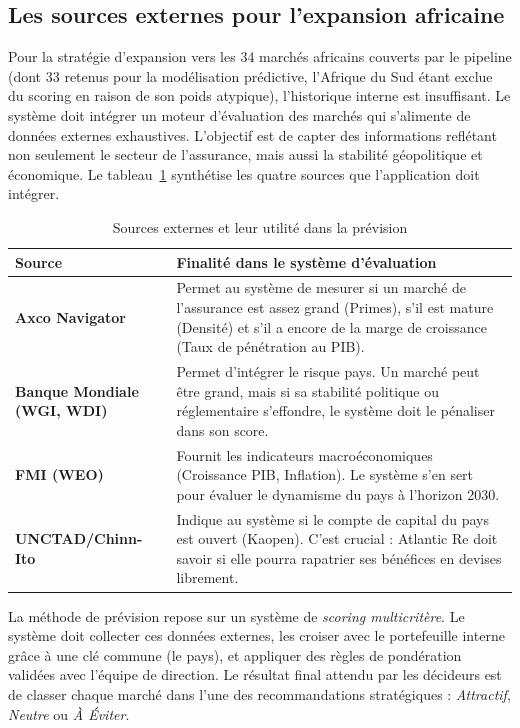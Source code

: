 \documentclass[12pt,a4paper]{report}
\begin{document}
\subsection{Les sources externes pour l'expansion africaine}

Pour la stratégie d'expansion vers les 34 marchés africains couverts par le pipeline (dont 33 retenus pour la modélisation prédictive, l'Afrique du Sud étant exclue du scoring en raison de son poids atypique), l'historique interne est insuffisant. Le système doit intégrer un moteur d'évaluation des marchés qui s'alimente de données externes exhaustives. L'objectif est de capter des informations reflétant non seulement le secteur de l'assurance, mais aussi la stabilité géopolitique et économique. Le tableau~\ref{tab:sources_externes} synthétise les quatre sources que l'application doit intégrer.

\begin{table}[H]
\centering
\caption{Sources externes et leur utilité dans la prévision}
\label{tab:sources_externes}
\small
\begin{tabularx}{\textwidth}{@{}p{3.5cm}X@{}}
\toprule
\textbf{Source} & \textbf{Finalité dans le système d'évaluation} \\
\midrule
\textbf{Axco Navigator} & Permet au système de mesurer si un marché de l'assurance est assez grand (Primes), s'il est mature (Densité) et s'il a encore de la marge de croissance (Taux de pénétration au PIB).\\
\textbf{Banque Mondiale \newline (WGI, WDI)} & Permet d'intégrer le risque pays. Un marché peut être grand, mais si sa stabilité politique ou réglementaire s'effondre, le système doit le pénaliser dans son score.\\
\textbf{FMI (WEO)} & Fournit les indicateurs macroéconomiques (Croissance PIB, Inflation). Le système s'en sert pour évaluer le dynamisme du pays à l'horizon 2030.\\
\textbf{UNCTAD/Chinn-Ito} & Indique au système si le compte de capital du pays est ouvert (Kaopen). C'est crucial : Atlantic Re doit savoir si elle pourra rapatrier ses bénéfices en devises librement.\\
\bottomrule
\end{tabularx}
\end{table}

La méthode de prévision repose sur un système de \textit{scoring multicritère}. Le système doit collecter ces données externes, les croiser avec le portefeuille interne grâce à une clé commune (le pays), et appliquer des règles de pondération validées avec l'équipe de direction. Le résultat final attendu par les décideurs est de classer chaque marché dans l'une des recommandations stratégiques : \textit{Attractif}, \textit{Neutre} ou \textit{À Éviter}.
\end{document}

